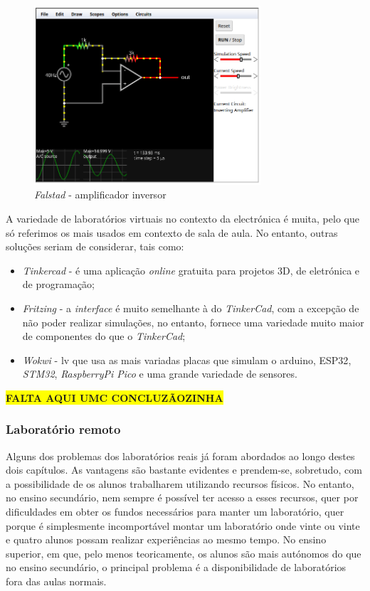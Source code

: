 \begin{figure}[hbtp]
    \centering
    \includegraphics[width=0.75\textwidth]{figures/falstad.png}
    \caption{\textit{Falstad} - amplificador inversor\cite{falstad}}
    \label{fig:falstad}
\end{figure}

A variedade de laboratórios virtuais no contexto da electrónica é muita, pelo que só referimos os mais usados em contexto de sala de aula. No entanto, outras soluções seriam de considerar, tais como: 
\begin{itemize}
    \item \textit{Tinkercad} - é uma aplicação \textit{online} gratuita para projetos 3D, de eletrónica e de programação;
    \item \textit{Fritzing} - a \textit{interface} é muito semelhante à do \textit{TinkerCad}, com a excepção de não poder realizar simulações, no entanto, fornece uma variedade muito maior de componentes do que o \textit{TinkerCad};
    \item \textit{Wokwi}\cite{wokwi} - \acrshort{lv} que usa as mais variadas placas que simulam o \gls{arduino}, \gls{ESP32}, \textit{STM32}, \textit{RaspberryPi Pico} e uma grande variedade de sensores\cite{wokwi}.
\end{itemize}

\colorbox{yellow}{\textbf{FALTA AQUI UMC CONCLUZÃOZINHA}}

\subsubsection{Laboratório remoto}
\label{sec: remotelaboratory}
Alguns dos problemas dos laboratórios reais já foram abordados ao longo destes dois capítulos. As vantagens são bastante evidentes e prendem-se, sobretudo, com a possibilidade de os alunos trabalharem utilizando recursos físicos. No entanto, no ensino secundário, nem sempre é possível ter acesso a esses recursos, quer por dificuldades em obter os fundos necessários para manter um laboratório, quer porque é simplesmente incomportável montar um laboratório onde vinte ou vinte e quatro alunos possam realizar experiências ao mesmo tempo. No ensino superior, em que, pelo menos teoricamente, os alunos são mais autónomos do que no ensino secundário, o principal problema é a disponibilidade de laboratórios fora das aulas normais.

